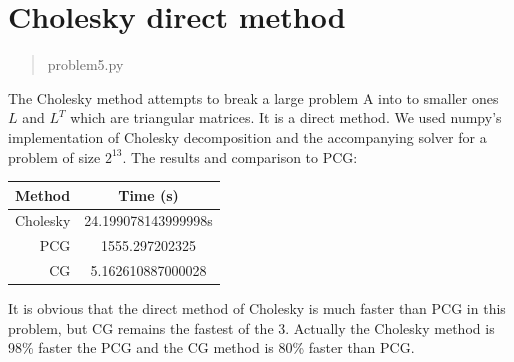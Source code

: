 \documentclass[a4paper]{article}
\begin{document}
\section{Cholesky direct method}
\begin{quote}
	problem5.py
\end{quote}
The Cholesky method attempts to break a large problem A into to smaller ones $L$ and $L^T$ which are triangular matrices. It is a direct method. We used numpy's implementation of Cholesky decomposition and the accompanying solver for a problem of size $2^{13}$. The results and comparison to PCG:

\begin{center}
	\begin{tabular}{r | c }
		Method & Time (s)\\ \hline
		Cholesky & 24.199078143999998s\\ \hline
		PCG & 1555.297202325\\ \hline
		CG & 5.162610887000028\\ \hline
	\end{tabular} 
\end{center}

It is obvious that the direct method of Cholesky is much faster than PCG in this problem, but CG remains the fastest of the 3. Actually the Cholesky method is 98\% faster the PCG and the CG method is 80\% faster than PCG.
\end{document}
